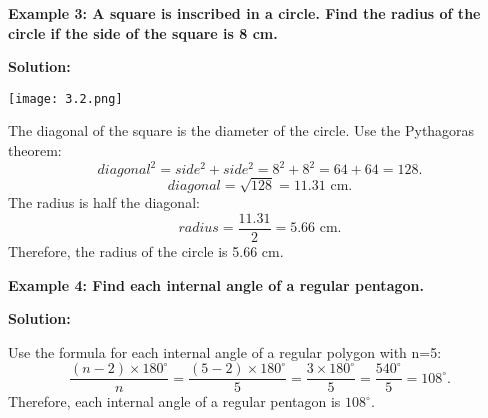 \begin{flushleft}
	\textbf{Example 3: A square is inscribed in a circle. Find the radius of the circle if the side of the square is 8 cm.}
	
	\vspace{0.5cm}
	\textbf{Solution:}
	\vspace{0.5cm}
	\begin{center}
		\texttt{[image: 3.2.png]}
		
	\end{center}
	The diagonal of the square is the diameter of the circle. Use the Pythagoras theorem:
	\[
	diagonal^2 = side^2 + side^2 = 8^2 + 8^2 = 64 + 64 = 128.
	\]
	\[
	diagonal = \sqrt{128} = 11.31 \text{ cm}.
	\]
	The radius is half the diagonal:
	\[
	radius = \frac{11.31}{2} = 5.66 \text{ cm}.
	\]
	Therefore, the radius of the circle is 5.66 cm.
\end{flushleft}

\begin{flushleft}
	\textbf{Example 4: Find each internal angle of a regular pentagon.}
	
	\vspace{0.5cm}
	\textbf{Solution:}
	\vspace{0.5cm}
	
	Use the formula for each internal angle of a regular polygon with n=5:
	\[
	\frac{(n-2) \times 180^\circ}{n} = \frac{(5-2) \times 180^\circ}{5} = \frac{3 \times 180^\circ}{5} = \frac{540^\circ}{5} = 108^\circ.
	\]
	Therefore, each internal angle of a regular pentagon is $108^\circ$.
\end{flushleft}
